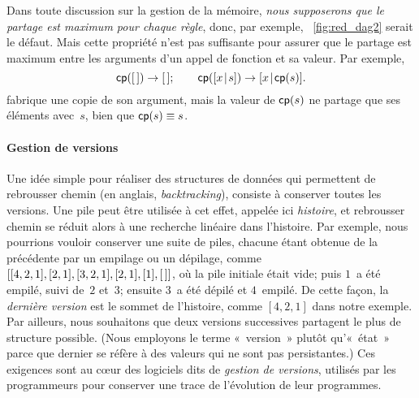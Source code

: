 
Dans toute discussion sur la gestion de la mémoire, \emph{nous
  supposerons que le partage est maximum pour chaque règle}, donc, par
exemple, \fig~\vref{fig:red_dag2} serait le défaut. Mais cette
propriété n'est pas suffisante pour assurer que le partage est maximum
entre les arguments d'un appel de fonction et sa valeur. Par exemple,
\begin{equation*}
\textsf{cp}([\,]) \rightarrow [\,];\qquad
\textsf{cp}([{x}\!\mid\!{s}]) \rightarrow [{x}\!\mid\!{\textsf{cp}(s)}].
\end{equation*}
fabrique une copie de son argument, mais la valeur de \(\textsf{cp}(s)\)
ne partage que ses éléments avec~\(s\), bien que \(\textsf{cp}(s) \equiv
s\).

\paragraph{Gestion de versions}

Une idée simple pour réaliser des structures de données qui permettent
de rebrousser chemin (en anglais, \emph{backtracking}), consiste à
conserver toutes les versions. Une pile peut être utilisée à cet effet, appelée ici
\emph{histoire}, et rebrousser chemin se
réduit alors à une recherche linéaire dans
l'histoire. Par exemple, nous pourrions vouloir conserver une suite de
piles, chacune étant obtenue de la précédente par un empilage ou un
dépilage, comme \([[4,2,1],[2,1],[3,2,1],[2,1],[1],[\,]]\), où la pile
initiale était vide; puis \(1\)~a été empilé, suivi de~\(2\) et~\(3\);
ensuite \(3\)~a été dépilé et \(4\)~empilé. De cette façon, la
\emph{dernière version} est le sommet de l'histoire, comme \([4,2,1]\)
dans notre exemple. Par ailleurs, nous souhaitons que deux versions
successives partagent le plus de structure possible. (Nous employons
le terme «~version~» plutôt qu'«~état~» parce que dernier se réfère à
des valeurs qui ne sont pas persistantes.) Ces exigences sont au
c{\oe}ur des logiciels dits de \emph{gestion de versions}, utilisés
par les programmeurs pour conserver une trace de l'évolution de leur
programmes.

